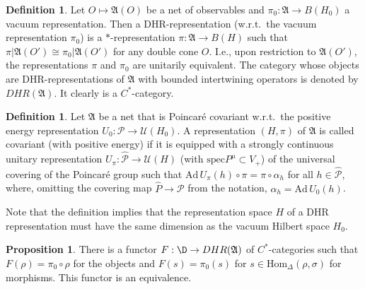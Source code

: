 \documentclass[12pt]{article}
\newcommand{\alg}[1]{\mathfrak{#1}}
\theoremstyle{definition}
\newtheorem{prop}[thm]{Proposition}
\theoremstyle{definition}
\newtheorem{defn}[thm]{Definition}
\theoremstyle{remark}
\def\2#1{{\mathcal #1}}
\newcommand{\Hom}{\mathrm{Hom}}
\newcommand{\rarr}{\rightarrow}
\begin{document}
\begin{defn} \label{def-dhr} Let $O\mapsto \alg{A}(O)$
  be a net of observables and $\pi_0:\alg{A}\rarr
  B(H_0)$ a vacuum representation.  Then a
  DHR-representation (w.r.t.\ the vacuum representation
  $\pi_0$) is a $*$-representation $\pi:\alg{A}\rarr
  B(H)$ such that
  $\pi|\alg{A}(O')\cong\pi_0|\alg{A}(O')$ for any
  double cone $O$.  I.e., upon restriction to
  $\alg{A}(O')$, the representations $\pi$ and $\pi_0$
  are unitarily equivalent. The category whose objects
  are DHR-representations of $\alg{A}$ with bounded
  intertwining operators is denoted by
  $DHR(\alg{A})$. It clearly is a $C^*$-category.
\end{defn}

\def\6#1{{\mathfrak #1}}

\begin{defn} \label{def-cov} Let $\6A$ be a net that is
  Poincar\'e covariant w.r.t.\ the positive energy
  representation $U_0:\2P\rarr\2U(H_0)$. A
  representation $(H,\pi)$ of $\6A$ is called covariant
  (with positive energy) if it is equipped with a
  strongly continuous unitary representation
  $U_\pi:\widehat{\2P}\rarr\2U(H)$ (with $\mathrm{spec}
  P^\mu\subset V_+$) of the universal covering of the
  Poincar\'e group such that
  $\mathrm{Ad}\,U_\pi(h)\circ\pi=\pi\circ\alpha_h$ for
  all $h\in\widehat{\2P}$, where, omitting the covering
  map $\widehat{P}\rarr\2P$ from the notation,
  $\alpha_h=\mathrm{Ad}\,U_0(h)$. \end{defn}

Note that the definition implies that the representation space $H$ of a DHR representation must have the same
dimension as the vacuum Hilbert space $H_0$.

\begin{prop} \label{prop-dhr} There is a functor $F:
  \D\rarr DHR(\alg{A})$ of $C^*$-categories such that
  $F(\rho)=\pi_0\circ\rho$ for the objects and
  $F(s)=\pi_0(s)$ for $s\in\Hom_\Delta(\rho,\sigma)$
  for morphisms. This functor is an equivalence.
\end{prop}
\end{document}
